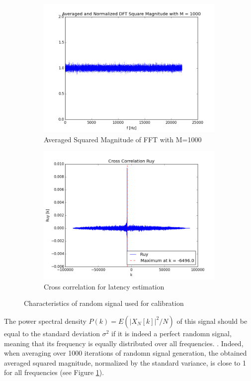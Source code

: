 \begin{figure}[htb]
\begin{subfigure}[b]{0.49\linewidth}
        \includegraphics[width=\linewidth]{files/random_M1000.png}
        \caption{Averaged Squared Magnitude of FFT with M=1000}
        \label{fig:random_M1000}
    \end{subfigure}
    \begin{subfigure}[b]{0.49\linewidth}
        \includegraphics[width=\linewidth]{files/audio_ruy.png}
        \caption{Cross correlation for latency estimation}
        \label{fig:audio_ruy}
    \end{subfigure}
    \caption{Characteristics of random signal used for calibration} 
	\label{fig:random}
\end{figure}

The power spectral density $P(k)=E(|X_N[k]|^2/N)$ of this signal should be equal to the standard deviation $\sigma^2$ if it is indeed a perfect randomn signal, meaning that its frequency is equally distributed over all frequencies. \cite{Vetterli}.
Indeed, when averaging over 1000 iterations of randomn signal generation, the obtained averaged squared magnitude, normalized by the standard variance, is close to 1 for all frequencies (see Figure \ref{fig:random_M1000}).

